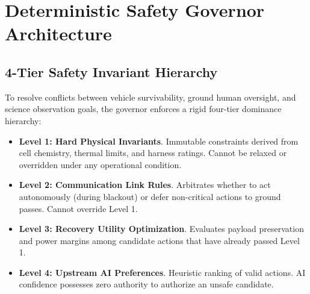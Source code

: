 \documentclass[conference]{IEEEtran}
\begin{document}
\section{Deterministic Safety Governor Architecture}

\subsection{4-Tier Safety Invariant Hierarchy}
To resolve conflicts between vehicle survivability, ground human oversight, and science observation goals, the governor enforces a rigid four-tier dominance hierarchy:
\begin{itemize}
    \item \textbf{Level 1: Hard Physical Invariants}. Immutable constraints derived from cell chemistry, thermal limits, and harness ratings. Cannot be relaxed or overridden under any operational condition.
    \item \textbf{Level 2: Communication Link Rules}. Arbitrates whether to act autonomously (during blackout) or defer non-critical actions to ground passes. Cannot override Level 1.
    \item \textbf{Level 3: Recovery Utility Optimization}. Evaluates payload preservation and power margins among candidate actions that have already passed Level 1.
    \item \textbf{Level 4: Upstream AI Preferences}. Heuristic ranking of valid actions. AI confidence possesses zero authority to authorize an unsafe candidate.
\end{itemize}

\begin{table}[t]
\caption{Immutable Hard Physical Safety Invariants}
\label{tab:invariants}
\centering
{}
\end{table}
\end{document}
